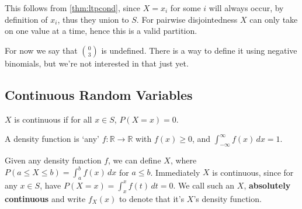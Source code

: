 \noindent This follows from \ref{thm:ltpcond}, since $X = x_i$ for some $i$ will always occur, by definition of $x_i$, thus they union to $S$. For pairwise disjointedness $X$ can only take on one value at a time, hence this is a valid partition.

\begin{remark}
For now we say that $\binom{0}{3}$ is undefined. There is a way to define it using negative binomials, but we're not interested in that just yet.
\end{remark}

\subsection{Continuous Random Variables}

\begin{definition}[Continuous]
$X$ is continuous if for all $x \in S$, $P(X = x) = 0$.
\end{definition}

\begin{definition}
    A density function is `any' $f: \mathbb{R} \to \mathbb{R}$ with $f(x) \geq 0$, and $\int_{-\infty}^{\infty} f(x) \, dx  = 1$.
\end{definition}

Given any density function $f$, we can define $X$, where $P(a \leq X \leq b) = \int_a^b f(x) \, dx$ for $a \leq b$. Immediately $X$ is continuous, since for any $x \in S$, have $P(X = x) = \int_x^x f(t) \, dt = 0$. We call such an $X$, \textbf{absolutely continuous} and write $f_X(x)$ to denote that it's $X$'s density function.
